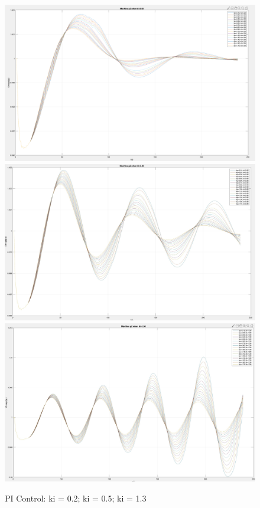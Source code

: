 \documentclass{report}
\begin{document}
\begin{figure}[!htbp]
  \includegraphics[width= \linewidth]{figure/3_4_1_tune_ki_1.png}
\endminipage\hfill
{}
  \includegraphics[width= \linewidth]{figure/3_4_1_tune_ki_2.jpeg}
\endminipage\hfill
{}%
  \includegraphics[width= \linewidth]{figure/3_4_1_tune_ki_3.jpeg}
\endminipage
\caption{PI Control: ki = 0.2; ki = 0.5; ki = 1.3}
\label{3_4_1_larger_ki}
\end{figure}
\end{document}
